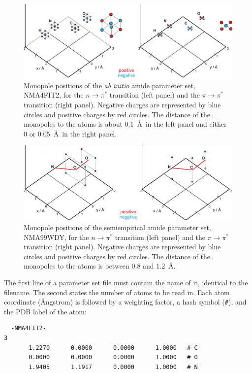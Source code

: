\documentclass[11pt, letterpaper]{article}
\newcommand{\npi} {$n\rightarrow\pi^*$\xspace}
\newcommand{\pipi}{$\pi\rightarrow\pi^*$\xspace}
\begin{document}
\begin{figure}[p]
\centering
\includegraphics[width=\textwidth]{figures/monopoles-hirst.eps}
\caption{Monopole positions of the \emph{ab initio} amide parameter set, NMA4FIT2,\cite{Besley:99:9636} for the \npi transition (left panel) and the \pipi transition (right panel). Negative charges are represented by blue circles and positive charges by red circles. The distance of the monopoles to the atoms is about 0.1~\AA\ in the left panel and either 0 or 0.05~\AA\ in the right panel.}
\label{Fig:Monopoles-Hirst}
\end{figure}

\begin{figure}[p]
\centering
\includegraphics[width=\textwidth]{figures/monopoles-woody.eps}
\caption[Monopole positions of the semiempirical amide parameter set]
        {Monopole positions of the semiempirical amide parameter set, NMA99WDY,\cite{Woody:99:2844} for the \npi transition (left panel) and the \pipi transition (right panel). Negative charges are represented by blue circles and positive charges by red circles. The distance of the monopoles to the atoms is between 0.8 and 1.2~\AA.}
\label{Fig:Monopoles-Woody}
\end{figure}

The first line of a parameter set file must contain the name of it, identical to the filename. The second states the number of atoms to be read in. Each atom coordinate (\AA ngstrom) is followed by a weighting factor, a hash symbol (\verb'#'), and the PDB label of the atom:

{\small
\begin{verbatim}
  -NMA4FIT2-
3
       1.2270      0.0000      0.0000      1.0000   # C
       0.0000      0.0000      0.0000      1.0000   # O
       1.9405      1.1917      0.0000      1.0000   # N
\end{verbatim}
}
\end{document}
